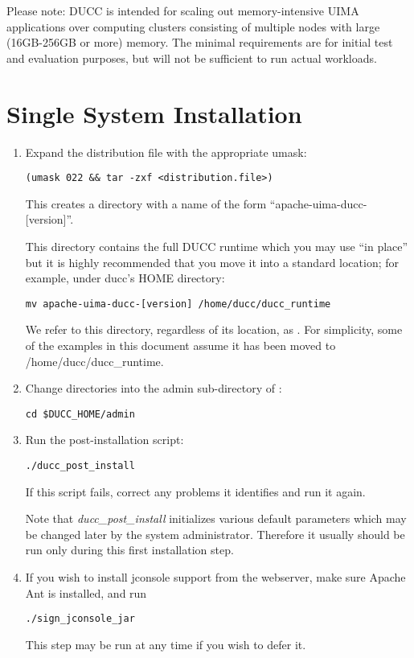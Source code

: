 Please note: DUCC is intended for scaling out memory-intensive UIMA applications over computing
clusters consisting of multiple nodes with large (16GB-256GB or more) memory.  The minimal
requirements are for initial test and evaluation purposes, but will not be sufficient to run actual
workloads.

\section{Single System Installation}
\label{subsec:install.single-user}
    \begin{enumerate}
      \item Expand the distribution file with the appropriate umask:
\begin{verbatim}
(umask 022 && tar -zxf <distribution.file>)
\end{verbatim}

        This creates a directory with a name of the form ``apache-uima-ducc-[version]''.
  
        This directory contains the full DUCC runtime which
        you may use ``in place'' but it is highly recommended that you move it
        into a standard location; for example, under ducc's HOME directory:
\begin{verbatim}
mv apache-uima-ducc-[version] /home/ducc/ducc_runtime
\end{verbatim}

        We refer to this directory, regardless of its location, as \duccruntime. For simplicity,
        some of the examples in this document assume it has been moved to /home/ducc/ducc\_runtime.

      \item Change directories into the admin sub-directory of \duccruntime: 
\begin{verbatim}
cd $DUCC_HOME/admin
\end{verbatim}

        \item Run the post-installation script: 
\begin{verbatim}
./ducc_post_install
\end{verbatim}
          If this script fails, correct any problems it identifies and run it again.

          Note that {\em ducc\_post\_install} initializes various default parameters which 
          may be changed later by the system administrator.  Therefore it usually should be
          run only during this first installation step.

        \item If you wish to install jconsole support from the webserver, make sure Apache Ant
          is installed, and run
\begin{verbatim}
./sign_jconsole_jar
\end{verbatim}
          This step may be run at any time if you wish to defer it.

   \end{enumerate}

